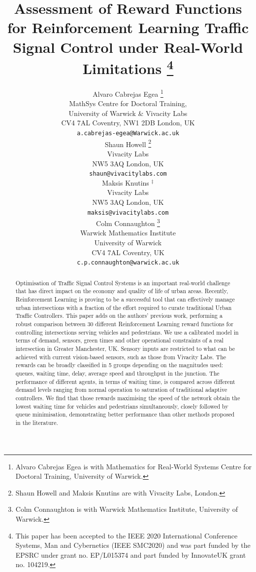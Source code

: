 \documentclass{article}
\title{Assessment of Reward Functions for Reinforcement Learning Traffic Signal Control under Real-World Limitations \thanks{This paper has been accepted to the IEEE 2020 International Conference Systems, Man and Cybernetics (IEEE SMC2020) and was part funded by the EPSRC under grant no. EP/L015374 and part funded by InnovateUK grant no. 104219.}}
\author{
  Alvaro Cabrejas Egea \thanks{Alvaro Cabrejas Egea is with Mathematics for Real-World Systems Centre for Doctoral Training, University of Warwick.} \\
  MathSys Centre for Doctoral Training, \\
  University of Warwick \& Vivacity Labs\\
  CV4 7AL Coventry, NW1 2DB London, UK \\
  \texttt{a.cabrejas-egea@Warwick.ac.uk} \\
  \And
 Shaun Howell \thanks{Shaun Howell and Maksis Knutins are with Vivacity Labs, London.}\\
  Vivacity Labs\\
   NW5 3AQ London, UK \\
  \texttt{shaun@vivacitylabs.com} \\
  \And
Maksis Knutins $^\ddag$ \\
  Vivacity Labs\\
   NW5 3AQ London, UK \\
  \texttt{maksis@vivacitylabs.com} \\
   \And
 Colm Connaughton \thanks{Colm Connaughton is with Warwick Mathematics Institute, University of Warwick.}\\
  Warwick Mathematics Institute\\
  University of Warwick\\
  CV4 7AL Coventry, UK \\
  \texttt{c.p.connaughton@warwick.ac.uk} \\
}
\begin{document}
\maketitle

\begin{abstract}
Optimisation of Traffic Signal Control Systems is an important real-world challenge that has direct impact on the economy and quality of life of urban areas.
Recently, Reinforcement Learning is proving to be a successful tool that can effectively manage urban intersections with a fraction of the effort required to curate traditional Urban Traffic Controllers. 
This paper adds on the authors' previous work, performing a robust comparison between 30 different Reinforcement Learning reward functions for controlling intersections serving vehicles and pedestrians. 
We use a calibrated model in terms of demand, sensors, green times and other operational constraints of a real intersection in Greater Manchester, UK. 
Sensory inputs are restricted to what can be achieved with current vision-based sensors, such as those from Vivacity Labs.
The rewards can be broadly classified in 5 groups depending on the magnitudes used: queues, waiting time, delay, average speed and throughput in the junction.
 The performance of different agents, in terms of waiting time, is compared across different demand levels ranging from normal operation to saturation of traditional adaptive controllers.
We find that those rewards maximising the speed of the network obtain the lowest waiting time for vehicles and pedestrians simultaneously, closely followed by queue minimisation, demonstrating better performance than other methods proposed in the literature.

\end{abstract}
\end{document}
